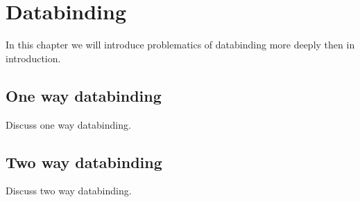 \chapter{Databinding}\label{chap:databinding}

In this chapter we will introduce problematics of databinding more deeply then in introduction.

\section{One way databinding}\label{sec:onewaydatabinding}

Discuss one way databinding.

\section{Two way databinding}

Discuss two way databinding.

